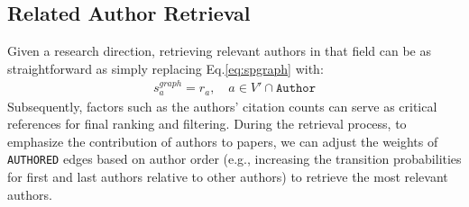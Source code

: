 \subsection{Related Author Retrieval}
Given a research direction, retrieving relevant authors in that field can be as straightforward as simply replacing Eq.\ref{eq:spgraph} with:
\begin{align}
    s_a^{graph} = r_a, \quad a \in V' \cap \texttt{Author}
\end{align}
Subsequently, factors such as the authors' citation counts can serve as critical references for final ranking and filtering.
During the retrieval process, to emphasize the contribution of authors to papers, we can adjust the weights of \texttt{AUTHORED} edges based on author order (e.g., increasing the transition probabilities for first and last authors relative to other authors) to retrieve the most relevant authors.


